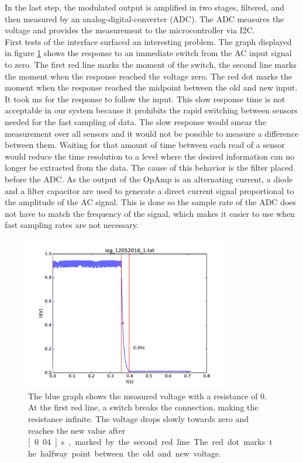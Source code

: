 In the last step, the modulated output is amplified in two stages, filtered, and then measured by an analog-digital-converter (ADC). The ADC measures the voltage and provides the measurement to the microcontroller via I2C.\\

First tests of the interface surfaced an interesting problem. The graph displayed in figure \ref{fig:swcap} shows the response to an immediate switch from the AC input signal to zero. The first red line marks the moment of the switch, the second line marks the moment when the response reached the voltage zero. The red dot marks the moment when the response reached the midpoint between the old and new input. It took \unit[40]{ms} for the response to follow the input. This slow response time is not acceptable in our system because it prohibits the rapid switching between sensors needed for the fast sampling of data. The slow response would smear the measurement over all sensors and it would not be possible to measure a difference between them. Waiting for that amount of time between each read of a sensor would reduce the time resolution to a level where the desired information can no longer be extracted from the data. The cause of this behavior is the filter placed before the ADC. As the output of the OpAmp is an alternating current, a diode and a filter capacitor are used to generate a direct current signal proportional to the amplitude of the AC signal. This is done so the sample rate of the ADC does not have to match the frequency of the signal, which makes it easier to use when fast sampling rates are not necessary.\\

\begin{figure}
	\begin{center}
		\includegraphics[width=0.8\textwidth]{images/switch_cap.pdf} 
		\caption{The blue graph shows the measured voltage with a resistance of 0. At the first red line, a switch breaks the connection, making the resistance infinite. The voltage drops slowly towards zero and reaches the new value after \unit[0.04]{s}, marked by the second red line. The red dot marks the halfway point between the old and new voltage.}
		\label{fig:swcap}
	\end{center}
\end{figure}

